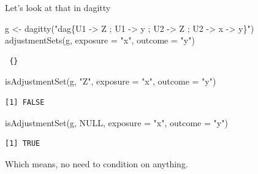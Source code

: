 \documentclass[
  11pt,
  ignorenonframetext,
]{beamer}
\newenvironment{Shaded}{\begin{snugshade}}{\end{snugshade}}
\newcommand{\AttributeTok}[1]{\textcolor[rgb]{0.40,0.45,0.13}{#1}}
\newcommand{\ConstantTok}[1]{\textcolor[rgb]{0.56,0.35,0.01}{#1}}
\newcommand{\FunctionTok}[1]{\textcolor[rgb]{0.28,0.35,0.67}{#1}}
\newcommand{\NormalTok}[1]{\textcolor[rgb]{0.00,0.23,0.31}{#1}}
\newcommand{\OtherTok}[1]{\textcolor[rgb]{0.00,0.23,0.31}{#1}}
\newcommand{\StringTok}[1]{\textcolor[rgb]{0.13,0.47,0.30}{#1}}
\begin{document}
\begin{frame}[fragile]{Let's look at that in dagitty}
\protect\hypertarget{lets-look-at-that-in-dagitty}{}
\begin{Shaded}
\begin{Highlighting}[]
\NormalTok{g }\OtherTok{\textless{}{-}} \FunctionTok{dagitty}\NormalTok{(}\StringTok{"dag\{U1 {-}\textgreater{} Z  ; U1 {-}\textgreater{} y ; U2 {-}\textgreater{} Z ; U2 {-}\textgreater{} x  {-}\textgreater{} y\}"}\NormalTok{)}
\FunctionTok{adjustmentSets}\NormalTok{(g, }\AttributeTok{exposure =} \StringTok{"x"}\NormalTok{, }\AttributeTok{outcome =} \StringTok{"y"}\NormalTok{)}
\end{Highlighting}
\end{Shaded}

\begin{verbatim}
 {}
\end{verbatim}

\begin{Shaded}
\begin{Highlighting}[]
\FunctionTok{isAdjustmentSet}\NormalTok{(g, }\StringTok{"Z"}\NormalTok{, }\AttributeTok{exposure =} \StringTok{"x"}\NormalTok{, }\AttributeTok{outcome =} \StringTok{"y"}\NormalTok{)}
\end{Highlighting}
\end{Shaded}

\begin{verbatim}
[1] FALSE
\end{verbatim}

\begin{Shaded}
\begin{Highlighting}[]
\FunctionTok{isAdjustmentSet}\NormalTok{(g, }\ConstantTok{NULL}\NormalTok{, }\AttributeTok{exposure =} \StringTok{"x"}\NormalTok{, }\AttributeTok{outcome =} \StringTok{"y"}\NormalTok{)}
\end{Highlighting}
\end{Shaded}

\begin{verbatim}
[1] TRUE
\end{verbatim}

Which means, no need to condition on anything.
\end{frame}
\end{document}
